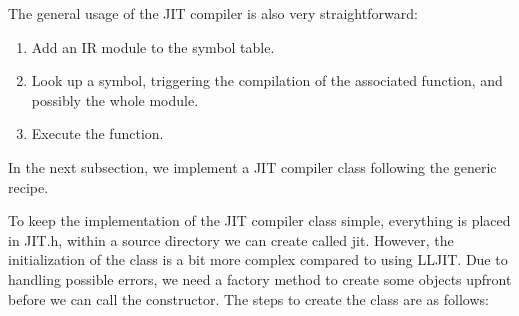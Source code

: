 The general usage of the JIT compiler is also very straightforward:

\begin{enumerate}
\item
Add an IR module to the symbol table.

\item
Look up a symbol, triggering the compilation of the associated function, and possibly the whole module.

\item
Execute the function.
\end{enumerate}

In the next subsection, we implement a JIT compiler class following the generic recipe.


To keep the implementation of the JIT compiler class simple, everything is placed in JIT.h, within a source directory we can create called jit. However, the initialization of the class is a bit more complex compared to using LLJIT. Due to handling possible errors, we need a factory method to create some objects upfront before we can call the constructor. The steps to create the class are as follows:

